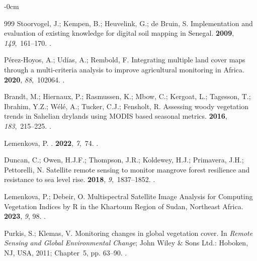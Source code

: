 \documentclass[earth,article,accept,pdftex,moreauthors]{Definitions/mdpi}
\begin{document}
{\begin{adjustwidth}{-\extralength}{0cm}
\begin{thebibliography}{999}
Stoorvogel, J.; Kempen, B.; Heuvelink, G.; {de Bruin}, S.
\newblock Implementation and evaluation of existing knowledge for digital soil
  mapping in Senegal.
 {\bf 2009}, {\em 149},~161--170.
.

Pérez-Hoyos, A.; Udías, A.; Rembold, F.
\newblock Integrating multiple land cover maps through a multi-criteria
  analysis to improve agricultural monitoring in Africa.
 {\bf 2020}, {\em 88},~102064.
.

Brandt, M.; Hiernaux, P.; Rasmussen, K.; Mbow, C.; Kergoat, L.; Tagesson, T.;
  Ibrahim, Y.Z.; Wélé, A.; Tucker, C.J.; Fensholt, R.
\newblock Assessing woody vegetation trends in Sahelian drylands using MODIS
  based seasonal metrics.
 {\bf 2016}, {\em 183},~215--225.
.

Lemenkova, P.
.
 {\bf 2022}, {\em 7},~74.
.

Duncan, C.; Owen, H.J.F.; Thompson, J.R.; Koldewey, H.J.; Primavera, J.H.;
  Pettorelli, N.
\newblock Satellite remote sensing to monitor mangrove forest resilience and
  resistance to sea level rise.
 {\bf 2018}, {\em
  9},~1837--1852.
.

Lemenkova, P.; Debeir, O.
\newblock Multispectral Satellite Image Analysis for Computing Vegetation
  Indices by R in the Khartoum Region of Sudan, Northeast Africa.
 {\bf 2023}, {\em 9}, 98.
.

Purkis, S.; Klemas, V. Monitoring changes in global vegetation cover.
\newblock In {\em Remote Sensing and Global Environmental Change}; John Wiley
  \& Sons Ltd.: Hoboken, NJ, USA, %
  2011; Chapter~5, pp. 63--90.
.


\end{thebibliography}
\end{adjustwidth}}
\end{document}
